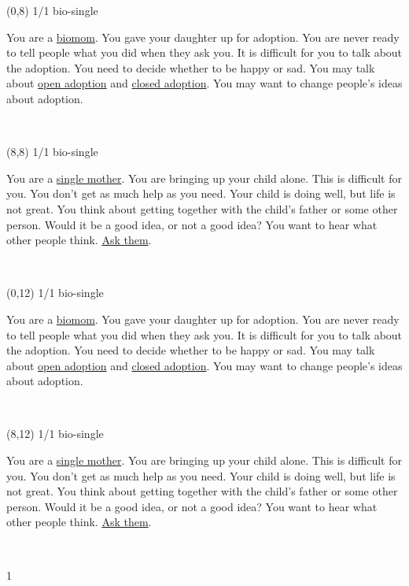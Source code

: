 \documentclass[a4paper]{article}
\newcommand{\mycard}[5]{%
	\vspace{0.1cm}
	\small #1 #2
	\par
	\parbox[t][6.7cm][c]{9.5cm}{%
	\hspace{0.1cm} \Large#3\\
	\normalsize#4 #5
	}
}
\begin{document}
\begin{textblock}{8}(0,8)
\mycard{1/1}{bio-single}{\parbox{9.0cm}{
You are a \ul{biomom}. You gave your daughter up for adoption. You are never ready to tell people what you did when they ask you. It is difficult for you to talk about the adoption. You need to decide whether to be happy or sad. You may talk about \ul{open adoption} and \ul{closed adoption}. You may want to change people's ideas about adoption.
}}{}{} 
\end{textblock}

\begin{textblock}{8}(8,8)
\mycard{1/1}{bio-single}{\parbox{9.0cm}{
You are a \ul{single mother}. You are bringing up your child alone. This is difficult for you. You don't get as much help as you need. Your child is doing well, but life is not great. You think about getting together with the child's father or some other person. Would it be a good idea, or not a good idea? You want to hear what other people think. \ul{Ask them}.
}}{}{} 
\end{textblock}

\begin{textblock}{8}(0,12)
\mycard{1/1}{bio-single}{\parbox{9.0cm}{
You are a \ul{biomom}. You gave your daughter up for adoption. You are never ready to tell people what you did when they ask you. It is difficult for you to talk about the adoption. You need to decide whether to be happy or sad. You may talk about \ul{open adoption} and \ul{closed adoption}. You may want to change people's ideas about adoption.
}}{}{} 
\end{textblock}

\begin{textblock}{8}(8,12)
\mycard{1/1}{bio-single}{\parbox{9.0cm}{
You are a \ul{single mother}. You are bringing up your child alone. This is difficult for you. You don't get as much help as you need. Your child is doing well, but life is not great. You think about getting together with the child's father or some other person. Would it be a good idea, or not a good idea? You want to hear what other people think. \ul{Ask them}.
}}{}{} 
\end{textblock}

\begin{tiny}1\end{tiny}\\
\newpage
\end{document}
